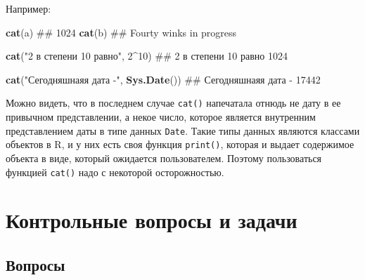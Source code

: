\documentclass[]{book}
\newenvironment{Shaded}{\begin{snugshade}}{\end{snugshade}}
\newcommand{\KeywordTok}[1]{\textcolor[rgb]{0.13,0.29,0.53}{\textbf{#1}}}
\newcommand{\DecValTok}[1]{\textcolor[rgb]{0.00,0.00,0.81}{#1}}
\newcommand{\StringTok}[1]{\textcolor[rgb]{0.31,0.60,0.02}{#1}}
\newcommand{\OperatorTok}[1]{\textcolor[rgb]{0.81,0.36,0.00}{\textbf{#1}}}
\newcommand{\NormalTok}[1]{#1}
\begin{document}
Например:

\begin{Shaded}
\begin{Highlighting}[]
\KeywordTok{cat}\NormalTok{(a)}
\NormalTok{## 1024}
\KeywordTok{cat}\NormalTok{(b)}
\NormalTok{## Fourty winks in progress}

\KeywordTok{cat}\NormalTok{(}\StringTok{"2 в степени 10 равно"}\NormalTok{, }\DecValTok{2}\OperatorTok{^}\DecValTok{10}\NormalTok{)}
\NormalTok{## 2 в степени 10 равно 1024}

\KeywordTok{cat}\NormalTok{(}\StringTok{"Сегодняшнаяя дата -"}\NormalTok{, }\KeywordTok{Sys.Date}\NormalTok{())}
\NormalTok{## Сегодняшнаяя дата - 17442}
\end{Highlighting}
\end{Shaded}

Можно видеть, что в последнем случае \texttt{cat()} напечатала отнюдь не
дату в ее привычном представлении, а некое число, которое является
внутренним представлением даты в типе данных \texttt{Date}. Такие типы
данных являются классами объектов в R, и у них есть своя функция
\texttt{print()}, которая и выдает содержимое объекта в виде, который
ожидается пользователем. Поэтому пользоваться функцией \texttt{cat()}
надо с некоторой осторожностью.

\section{Контрольные вопросы и задачи}\label{questions_tasks_basics}

\subsection{Вопросы}\label{questions_basics}
\end{document}
